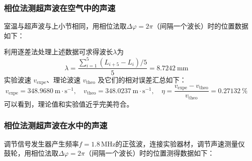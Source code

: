 \documentclass[UTF8]{article}
\theoremstyle{MyLineTheoremStyle} %
\theoremstyle{MyBlockTheoremStyle} %
\theoremstyle{MySubsubsectionStyle} %
\begin{document}
\subsubsection{相位法测超声波在空气中的声速}
室温与超声波与上小节相同，用相位法取$ \Delta\varphi=2\pi $（间隔一个波长）时的位置数据如下：
\begin{table}[H]\centering
    \caption{相位法求空气中声波波速}
    \label{相位法求空气中声波波速}
\end{table}

利用逐差法处理上述数据可求得波长$ \lambda $为
\begin{equation}
\lambda=\frac{\sum_{i=1}^{5}(L_{i+5}-L_i)/5}{5}= 8.7242 \ \mathrm{mm}
\end{equation}
实验波速 $v_{\text{expe}}$、理论波速 $v_{\text{theo}}$ 及它们的相对误差汇总如下：
\begin{equation}
    v_{\text{expe}} = 348.9680 \ \mathrm{m \cdot s^{-1}},\quad 
    v_{\text{theo}} = 348.0237 \ \mathrm{m \cdot s^{-1}},\quad 
    \eta = \frac{v_{\text{expe}} - v_{\text{theo}}}{v_{\text{theo}}} = 0.27132\ \%
\end{equation}
可以看到，理论值和实验值近乎完美符合。

\subsubsection{相位法测超声波在水中的声速}
调节信号发生器产生频率$ f=1.8\,\mathrm{MHz} $的正弦波，连接实验器材，调节声速测量仪鼓轮，用相位法取$ \Delta\varphi=2\pi $（间隔一个波长）时的位置测得数据如下：
\begin{table}[H]\centering
    \caption{驻波法求水中超声波波速}
    \label{驻波法求水中超声波波速}
\end{table}
\end{document}

